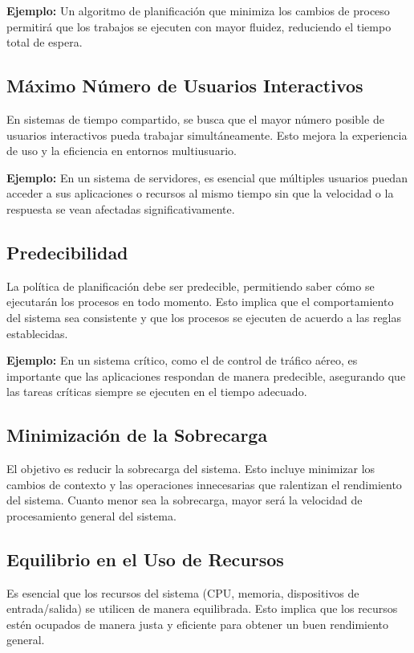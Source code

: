 \textbf{Ejemplo:} Un algoritmo de planificación que minimiza los cambios de proceso permitirá que los trabajos se ejecuten con mayor fluidez, reduciendo el tiempo total de espera.

\subsection{Máximo Número de Usuarios Interactivos}
En sistemas de tiempo compartido, se busca que el mayor número posible de usuarios interactivos pueda trabajar simultáneamente. Esto mejora la experiencia de uso y la eficiencia en entornos multiusuario.

\textbf{Ejemplo:} En un sistema de servidores, es esencial que múltiples usuarios puedan acceder a sus aplicaciones o recursos al mismo tiempo sin que la velocidad o la respuesta se vean afectadas significativamente.

\subsection{Predecibilidad}
La política de planificación debe ser predecible, permitiendo saber cómo se ejecutarán los procesos en todo momento. Esto implica que el comportamiento del sistema sea consistente y que los procesos se ejecuten de acuerdo a las reglas establecidas.

\textbf{Ejemplo:} En un sistema crítico, como el de control de tráfico aéreo, es importante que las aplicaciones respondan de manera predecible, asegurando que las tareas críticas siempre se ejecuten en el tiempo adecuado.

\subsection{Minimización de la Sobrecarga}
El objetivo es reducir la sobrecarga del sistema. Esto incluye minimizar los cambios de contexto y las operaciones innecesarias que ralentizan el rendimiento del sistema. Cuanto menor sea la sobrecarga, mayor será la velocidad de procesamiento general del sistema.



\subsection{Equilibrio en el Uso de Recursos}
Es esencial que los recursos del sistema (CPU, memoria, dispositivos de entrada/salida) se utilicen de manera equilibrada. Esto implica que los recursos estén ocupados de manera justa y eficiente para obtener un buen rendimiento general.

